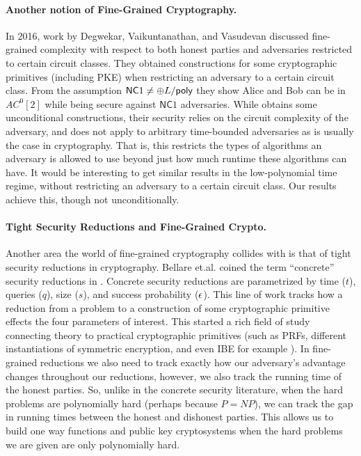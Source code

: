 \paragraph{Another notion of Fine-Grained Cryptography.} In 2016, work by Degwekar, Vaikuntanathan, and Vasudevan \cite{DVV16} discussed fine-grained complexity with respect to both honest parties and adversaries restricted to certain circuit classes. They obtained constructions for some cryptographic primitives (including PKE) when restricting an adversary to a certain circuit class. From the assumption $\mathsf{NC}1 \neq \oplus L/\mathsf{poly}$ they show Alice and Bob can be in $AC^0[2]$ while being secure against $\mathsf{NC}1$ adversaries. While \cite{DVV16} obtains some unconditional constructions, their security relies on the circuit complexity of the adversary, and does not apply to arbitrary time-bounded adversaries as is usually the case in cryptography. That is, this restricts the types of algorithms an adversary is allowed to use beyond just how much runtime these algorithms can have. It would be interesting to get similar results in the low-polynomial time regime, without restricting an adversary to a certain circuit class. Our results achieve this, though not unconditionally.

\paragraph{Tight Security Reductions and Fine-Grained Crypto.}
Another area the world of fine-grained cryptography collides with is that of tight security reductions in cryptography. Bellare et.al. coined the term ``concrete'' security reductions in \cite{BellareKR94,BellareGR95}. Concrete security reductions are parametrized by time ($t$), queries ($q$), size ($s$), and success probability ($\epsilon$). 
This line of work tracks how a reduction from a problem to a  construction of some cryptographic primitive effects the four parameters of interest.  
This started a rich field of study connecting theory to practical cryptographic primitives (such as PRFs, different instantiations of symmetric encryption, and even IBE for example \cite{BellareCK96,BellareDJR97,KatzW03,BellareR09}).
In fine-grained reductions we also need to track exactly how our adversary's advantage changes throughout our reductions, however, we also track the running time of the honest parties.
So, unlike in the concrete security literature, when the hard problems are polynomially hard (perhaps because $P=NP$), we can track the gap in running times between the honest and dishonest parties. This allows us to build one way functions and public key cryptosystems when the hard problems we are given are only polynomially hard. 
\vspace{-0.5cm}

